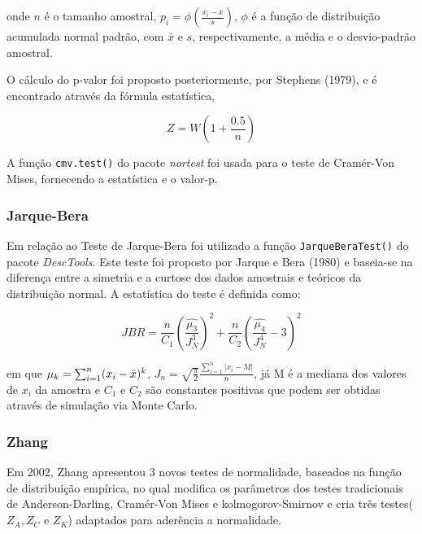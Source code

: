 \documentclass[a4paper,11pt]{article} %
\begin{document}
onde $n$ é o tamanho amostral, $p_{i} = \phi \left(  \frac{x_{i}-\bar{x}}{s} \right)$, $\phi$ é a função de distribuição acumulada normal padrão, com $\bar{x}$ e $s$, respectivamente, a média e o desvio-padrão amostral.

\vspace{0.5cm}

O cálculo do p-valor foi proposto posteriormente, por Stephens (1979), e é encontrado através da fórmula estatística,

\begin{equation}
    Z = W \left(1 + \frac{0.5}{n} \right)
\end{equation}

A função \texttt{cmv.test()} do pacote \textit{nortest} foi usada para o teste de Cramér-Von Mises, fornecendo a estatística e o valor-p.

\subsubsection{Jarque-Bera}

Em relação ao Teste de Jarque-Bera foi utilizado a função  \texttt{JarqueBeraTest()} do pacote \textit{DescTools}. Este teste foi proposto por Jarque e Bera (1980) e baseia-se na diferença entre a simetria e a curtose dos dados amostrais e teóricos da distribuição normal. A estatística do teste é definida como: 

\begin{equation}
    JBR = \frac{n}{C_{1}} \left( \frac{\hat{\mu_{3}}}{J^{3}_{N}}  \right)^{2} + \frac{n}{C_{2}} \left( \frac{ \hat{\mu_{4}}}{J^{4}_{N}} - 3 \right)^{2} 
\end{equation}


em que $\mu_{k} = \sum_{i=1}^{n} (x_{i}- \Bar{x})^{k}$, $J_{n} = \sqrt{\frac{\pi}{2}}\frac{\sum_{i=1}^{n}|x_{i}-M|}{n}$, já M é a mediana dos valores de $x_{i}$ da amostra e $C_{1}$ e $C_{2}$ são constantes positivas que podem ser obtidas através de simulação via Monte Carlo.

\subsubsection{Zhang}

Em 2002, Zhang apresentou 3 novos testes de normalidade, baseados na função de distribuição empírica, no qual modifica os parâmetros dos testes tradicionais de Anderson-Darling, Cramér-Von Mises e kolmogorov-Smirnov e cria três testes($Z_{A}, Z_{C}$ e $Z_{K}$) adaptados para aderência a normalidade.
\end{document}

